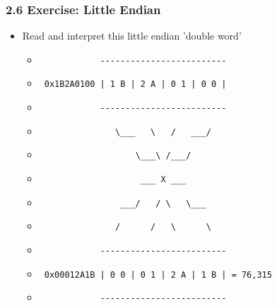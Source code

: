 \begin{frame}[fragile]
  \frametitle{2.6 Exercise: Little Endian}
    \begin{itemize}
        \item[] Read and interpret this little endian 'double word'
            \begin{itemize}
                \item[] \begin{verbatim}            ------------------------- \end{verbatim}
                \item[] \begin{verbatim} 0x1B2A0100 | 1 B | 2 A | 0 1 | 0 0 | \end{verbatim}
                \item[] \begin{verbatim}            ------------------------- \end{verbatim}
                \item[] \begin{verbatim}               \___   \   /   ___/    \end{verbatim}
                \item[] \begin{verbatim}                   \___\ /___/        \end{verbatim}
                \item[] \begin{verbatim}                    ___ X ___         \end{verbatim}
                \item[] \begin{verbatim}                ___/   / \   \___     \end{verbatim}
                \item[] \begin{verbatim}               /      /   \      \    \end{verbatim}
                \item[] \begin{verbatim}            ------------------------- \end{verbatim}
                \item[] \begin{verbatim} 0x00012A1B | 0 0 | 0 1 | 2 A | 1 B | = 76,315 \end{verbatim}
                \item[] \begin{verbatim}            ------------------------- \end{verbatim}
            \end{itemize}
    \end{itemize}
\end{frame}


